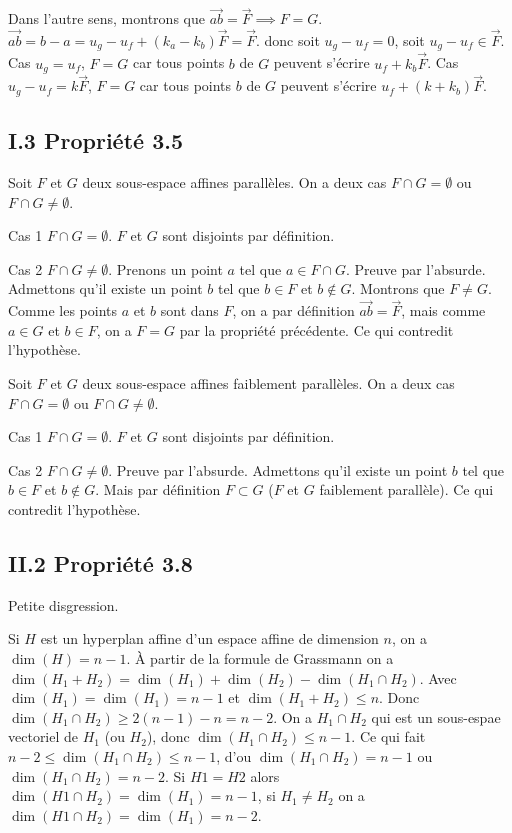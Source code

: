 \documentclass[]{book}
\theoremstyle{definition}
\newcommand{\vect}[1]{\overrightarrow{#1}}
\begin{document}
Dans l'autre sens, montrons que $\vect{ab} = \vect{F} \implies  F = G$. $\vect{ab} = b - a =  u_g - u_f + (k_a - k_b)\vect{F} = \vect{F}$. donc soit $u_g - u_f  = 0$, soit $u_g - u_f \in \vect{F}$. Cas $u_g = u_f$, $F=G$ car tous points $b$ de $G$ peuvent s'\'ecrire $u_f + k_b\vect{F}$. Cas $u_g - u_f = k\vect{F}$, $F=G$ car tous points $b$ de $G$ peuvent s'\'ecrire $u_f + (k+k_b)\vect{F}$.

\subsection*{I.3 Propri\'et\'e 3.5}
Soit $F$ et $G$ deux sous-espace affines parall\`eles. On a deux cas $F \cap G = \emptyset$ ou $F \cap G \neq \emptyset$.

Cas 1 $F \cap G = \emptyset$. $F$ et $G$ sont disjoints par d\'efinition.

Cas 2 $F \cap G \neq \emptyset$. Prenons un point $a$ tel que $a \in F \cap G$. Preuve par l'absurde. Admettons qu'il existe un point $b$ tel que $b \in F$ et $b \not \in G$. Montrons que $F \neq G$. Comme les points $a$ et $b$ sont dans $F$, on a par d\'efinition $\vect{ab} = \vect{F}$, mais comme $a \in G$ et $b \in F$, on a $F = G$ par la propri\'et\'e pr\'ec\'edente. Ce qui contredit l'hypoth\`ese.  


Soit $F$ et $G$ deux sous-espace affines faiblement parall\`eles. On a deux cas $F \cap G = \emptyset$ ou $F \cap G \neq \emptyset$.

Cas 1 $F \cap G = \emptyset$. $F$ et $G$ sont disjoints par d\'efinition.

Cas 2 $F \cap G \neq \emptyset$. Preuve par l'absurde. Admettons qu'il existe un point $b$ tel que $b \in F$ et $b \not \in G$. Mais par d\'efinition $F \subset G$ ($F$ et $G$ faiblement parall\`ele). Ce qui contredit l'hypoth\`ese.  




\subsection*{II.2 Propri\'et\'e 3.8}
Petite disgression.

Si $H$ est un hyperplan affine d'un espace affine de dimension $n$, on a $\dim(H) = n-1$. \`A partir de la formule de Grassmann on a $\dim(H_1+H_2) = \dim(H_1) + \dim(H_2) - \dim(H_1 \cap H_2)$. Avec $\dim(H_1) = \dim(H_1) = n-1$ et $\dim(H_1+H_2) \leq n$. Donc $\dim(H_1 \cap H_2) \geq 2(n-1) - n = n-2$. On a $H_1 \cap H_2$ qui est un sous-espae vectoriel de $H_1$ (ou $H_2$), donc $\dim(H_1 \cap H_2) \leq n-1$. Ce qui fait $n-2 \leq \dim(H_1 \cap H_2) \leq n-1$, d'ou $\dim(H_1 \cap H_2) = n-1$ ou $\dim(H_1 \cap H_2) = n-2$. Si $H1 = H2$ alors $\dim(H1 \cap H_2) = \dim(H_1) = n-1$, si $H_1 \neq H_2$ on a $\dim(H1 \cap H_2) = \dim(H_1) = n-2$.
\end{document}

